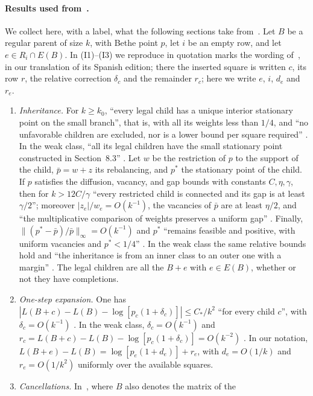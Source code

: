 \paragraph{Results used from~\cite{pred}.}
We collect here, with a label, what the following sections take from~\cite{pred}. Let $B$ be a
regular parent of size $k$, with Bethe point $p$, let $i$ be an empty row, and let
$e\in R_i\cap E(B)$. In (I1)--(I3) we reproduce in quotation marks the wording of~\cite{pred}, in
our translation of its Spanish edition; there the inserted square is written $c$, its row $r$, the
relative correction $\delta_c$ and the remainder $r_c$; here we write $e$, $i$, $d_e$ and $r_e$.
\begin{enumerate}[({I}1)]
\item \emph{Inheritance.} For $k\ge k_0$, ``every legal child has a unique interior stationary point
on the small branch'', that is, with all its weights less than $1/4$, and ``no unfavorable children
are excluded, nor is a lower bound per square required'' \cite[Theorem~7.1]{pred}. In the weak
class, ``all its legal children have the small stationary point constructed in
Section~8.3'' \cite[Theorem~8.1]{pred}. Let $w$ be the restriction of $p$ to the support of the
child, $\bar p=w+z$ its rebalancing, and $p^*$ the stationary point of the child. If $p$ satisfies
the diffusion, vacancy, and gap bounds with constants $C,\eta,\gamma$, then for $k>12C/\gamma$
``every restricted child is connected and its gap is at least $\gamma/2$''; moreover
$|z_e|/w_e=O(k^{-1})$, the vacancies of $\bar p$ are at least $\eta/2$, and ``the multiplicative
comparison of weights preserves a uniform gap'' \cite[Section~6.5]{pred}. Finally,
$\|(p^*-\bar p)/\bar p\|_\infty=O(k^{-1})$ and $p^*$ ``remains feasible and positive, with uniform
vacancies and $p^*<1/4$'' \cite[Section~7.2]{pred}. In the weak class the same relative bounds hold
and ``the inheritance is from an inner class to an outer one with a margin''
\cite[Sections~8.2 and~8.3]{pred}. The legal children are all the $B+e$ with $e\in E(B)$, whether or not
they have completions.
\item \emph{One-step expansion.} One has
$|L(B+c)-L(B)-\log[p_c(1+\delta_c)]|\le C_*/k^2$ ``for every child $c$'', with
$\delta_c=O(k^{-1})$ \cite[Theorem~7.1]{pred}. In the weak class, $\delta_c=O(k^{-1})$ and
$r_c=L(B+c)-L(B)-\log[p_c(1+\delta_c)]=O(k^{-2})$ \cite[Sections~7.8, 8.2 and~8.5]{pred}. In our
notation, $L(B+e)-L(B)=\log[p_e(1+d_e)]+r_e$, with $d_e=O(1/k)$ and $r_e=O(1/k^2)$
uniformly over the available squares.
\item \emph{Cancellations.} In~\cite[Section~6.1]{pred}, where $B$ also denotes the matrix of the

\end{enumerate}
